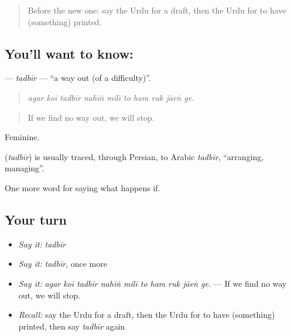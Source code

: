 \label{lesson:UR-C524-tadbir}



\begin{quote}
Before the new one: say the Urdu for a draft, then the Urdu for to have (something) printed.
\end{quote}

\subsection*{You'll want to know: }
\textbf{} — \emph{tadbīr} — \textquotedblleft{}a way out (of a difficulty)\textquotedblright{}.

\begin{quote}
         
\end{quote}

\begin{quote}
\emph{agar koī tadbīr nahīṅ milī to ham ruk jāeṅ ge.}
\end{quote}

\begin{quote}
If we find no way out, we will stop.
\end{quote}

Feminine.

\begin{cousinweb}
\textbf{} (\emph{tadbīr}) is usually traced, through Persian, to Arabic \emph{tadbīr}, \textquotedblleft{}arranging, managing\textquotedblright{}.
\end{cousinweb}

\begin{grammarlens}[title={What you've built}]
One more word for saying what happens if.
\end{grammarlens}

\subsection*{Your turn}
\begin{itemize}
\raggedright
  \item \emph{Say it:} \emph{tadbīr}
  \item \emph{Say it:} \emph{tadbīr}, once more
  \item \emph{Say it:} \emph{agar koī tadbīr nahīṅ milī to ham ruk jāeṅ ge.} — If we find no way out, we will stop.
  \item \emph{Recall:} say the Urdu for a draft, then the Urdu for to have (something) printed, then say \emph{tadbīr} again
\end{itemize}

